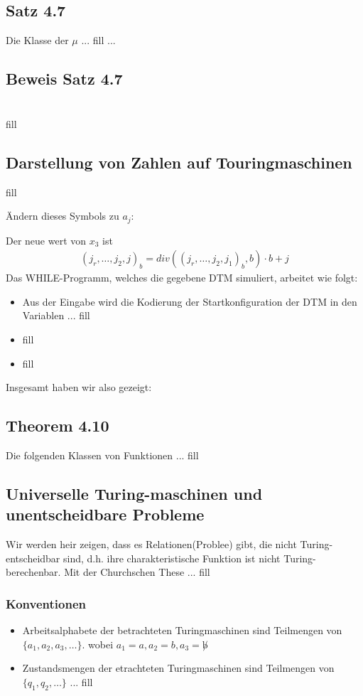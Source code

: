 \subsection{Satz 4.7}
Die Klasse der $\mu$  ... fill ...
\subsection{Beweis Satz 4.7}

\section{}
fill
\subsection{Darstellung von Zahlen auf Touringmaschinen}
fill\par
Ändern dieses Symbols zu $a_j$:\par 
Der neue wert von $x_3$ ist
\begin{align*}
	(j_r, \ldots, j_2, j)_b = div((j_r, \ldots, j_2, j_1)_b, b)\cdot b+j
\end{align*}
Das WHILE-Programm, welches die gegebene DTM simuliert, arbeitet wie folgt:
\begin{itemize}
	\item Aus der Eingabe wird die Kodierung der Startkonfiguration der DTM in den Variablen ... fill
	\item fill
	\item fill
\end{itemize}
Insgesamt haben wir also gezeigt:
\subsection{Theorem 4.10}
Die folgenden Klassen von Funktionen ... fill
\subsection{Universelle Turing-maschinen und unentscheidbare Probleme}
Wir werden heir zeigen, dass es Relationen(Problee) gibt, die nicht Turing-entscheidbar sind, d.h. ihre charakteristische Funktion ist nicht Turing-berechenbar. Mit der Churchschen These ... fill
\subsubsection{Konventionen}
\begin{itemize}
	\item Arbeitsalphabete der betrachteten Turingmaschinen sind Teilmengen von $\{a_1, a_2, a_3, \ldots\}$. wobei $a_1 = a, a_2 = b, a_3 = \not b$
	\item Zustandsmengen der etrachteten Turingmaschinen sind Teilmengen von $\{q_1, q_2, \ldots\}$ ... fill
	\end{itemize}
